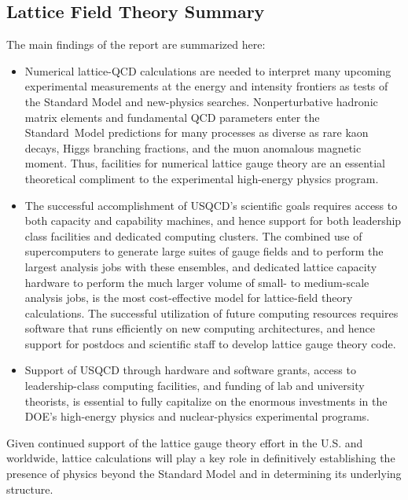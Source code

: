 \subsection{Lattice Field Theory Summary}

The main findings of the report are summarized here:

\begin{itemize}

\item Numerical lattice-QCD calculations are needed to interpret many upcoming
experimental measurements at the energy and intensity frontiers as tests of
the Standard Model and new-physics searches.  Nonperturbative hadronic matrix
elements and fundamental QCD parameters enter the Standard~Model predictions
for many processes as diverse as rare kaon decays, Higgs branching fractions,
and the muon anomalous magnetic moment.  Thus, facilities for numerical
lattice gauge theory are an essential theoretical compliment to the
experimental high-energy physics program.

\item The successful accomplishment of USQCD's scientific goals requires
access to both capacity and capability machines, and hence support for both
leadership class facilities and dedicated computing clusters.  The combined
use of supercomputers to generate large suites of gauge fields and to perform
the largest analysis jobs with these ensembles, and dedicated lattice capacity
hardware to perform the much larger volume of small- to medium-scale analysis
jobs, is the most cost-effective model for lattice-field theory calculations.
The successful utilization of future computing resources requires software
that runs efficiently on new computing architectures, and hence support for
postdocs and scientific staff to develop lattice gauge theory code.

\item Support of USQCD through hardware and software grants, access to
leadership-class computing facilities, and funding of lab and university
theorists, is essential to fully capitalize on the enormous investments in the
DOE's high-energy physics and nuclear-physics experimental programs.

\end{itemize}

Given continued support of the lattice gauge theory effort in the U.S. and
worldwide, lattice calculations will play a key role in definitively
establishing the presence of physics beyond the Standard Model and in
determining its underlying structure.
